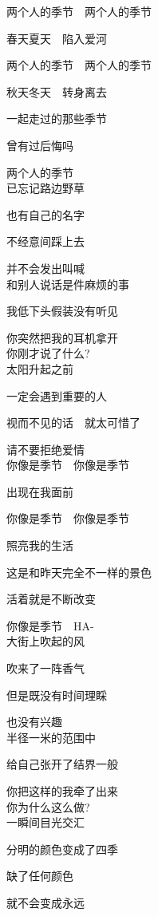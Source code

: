 两个人的季节　两个人的季节

春天夏天　陷入爱河

两个人的季节　两个人的季节

秋天冬天　转身离去

一起走过的那些季节

曾有过后悔吗

两个人的季节
\\

已忘记路边野草

也有自己的名字

不经意间踩上去

并不会发出叫喊
\\

和别人说话是件麻烦的事

我低下头假装没有听见

你突然把我的耳机拿开
\\

你刚才说了什么?
\\

太阳升起之前

一定会遇到重要的人

视而不见的话　就太可惜了

请不要拒绝爱情
\\

你像是季节　你像是季节

出现在我面前

你像是季节　你像是季节

照亮我的生活

这是和昨天完全不一样的景色

活着就是不断改变

你像是季节　HA-
\\

大街上吹起的风

吹来了一阵香气

但是既没有时间理睬

也没有兴趣
\\

半径一米的范围中

给自己张开了结界一般

你把这样的我牵了出来
\\

你为什么这么做?
\\

一瞬间目光交汇

分明的颜色变成了四季

缺了任何颜色

就不会变成永远
\\

